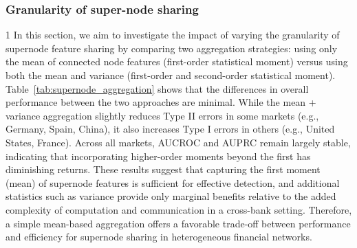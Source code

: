\subsubsection{Granularity of super-node sharing}
\label{supernode_high_order_results}1
In this section, we aim to investigate the impact of varying the granularity of supernode feature sharing by comparing two aggregation strategies: using only the mean of connected node features (first-order statistical moment) versus using both the mean and variance (first-order and second-order statistical moment). Table~\ref{tab:supernode_aggregation} shows that the differences in overall performance between the two approaches are minimal. While the mean + variance aggregation slightly reduces Type II errors in some markets (e.g., Germany, Spain, China), it also increases Type I errors in others (e.g., United States, France). Across all markets, AUCROC and AUPRC remain largely stable, indicating that incorporating higher-order moments beyond the first has diminishing returns. These results suggest that capturing the first moment (mean) of supernode features is sufficient for effective detection, and additional statistics such as variance provide only marginal benefits relative to the added complexity of computation and communication in a cross-bank setting. Therefore, a simple mean-based aggregation offers a favorable trade-off between performance and efficiency for supernode sharing in heterogeneous financial networks.
